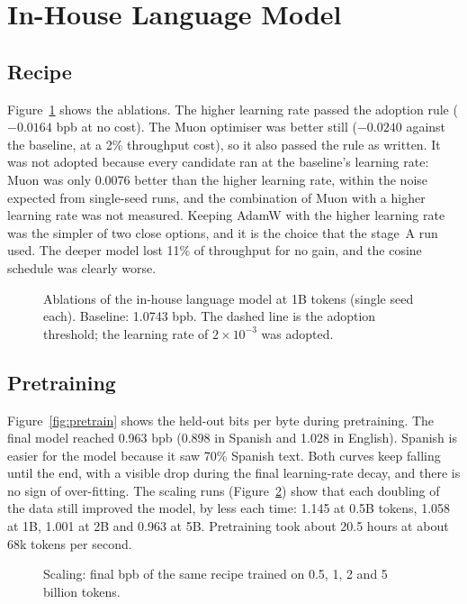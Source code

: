 \section{In-House Language Model}

\subsection*{Recipe}

Figure~\ref{fig:ablations} shows the ablations. The higher learning rate passed the adoption rule ($-0.0164$ bpb at no cost). The Muon optimiser was better still ($-0.0240$ against the baseline, at a 2\% throughput cost), so it also passed the rule as written. It was not adopted because every candidate ran at the baseline's learning rate: Muon was only 0.0076 better than the higher learning rate, within the noise expected from single-seed runs, and the combination of Muon with a higher learning rate was not measured. Keeping AdamW with the higher learning rate was the simpler of two close options, and it is the choice that the stage~A run used. The deeper model lost 11\% of throughput for no gain, and the cosine schedule was clearly worse.

\begin{figure}[H]
\centering
{}
\caption{Ablations of the in-house language model at 1B tokens (single seed each). Baseline: 1.0743 bpb. The dashed line is the adoption threshold; the learning rate of $2\times10^{-3}$ was adopted.}
\label{fig:ablations}
\end{figure}

\subsection*{Pretraining}

Figure~\ref{fig:pretrain} shows the held-out bits per byte during pretraining. The final model reached 0.963 bpb (0.898 in Spanish and 1.028 in English). Spanish is easier for the model because it saw 70\% Spanish text. Both curves keep falling until the end, with a visible drop during the final learning-rate decay, and there is no sign of over-fitting. The scaling runs (Figure~\ref{fig:scaling}) show that each doubling of the data still improved the model, by less each time: 1.145 at 0.5B tokens, 1.058 at 1B, 1.001 at 2B and 0.963 at 5B. Pretraining took about 20.5 hours at about 68k tokens per second.

\begin{figure}[H]
\centering
\begin{minipage}{0.55\textwidth}
\centering
{}
\caption{Held-out bits per byte during pretraining. The learning-rate decay starts at 4B tokens.}
\label{fig:pretrain}
\end{minipage}\hfill
\begin{minipage}{0.42\textwidth}
\centering
{}
\caption{Scaling: final bpb of the same recipe trained on 0.5, 1, 2 and 5 billion tokens.}
\label{fig:scaling}
\end{minipage}
\end{figure}

